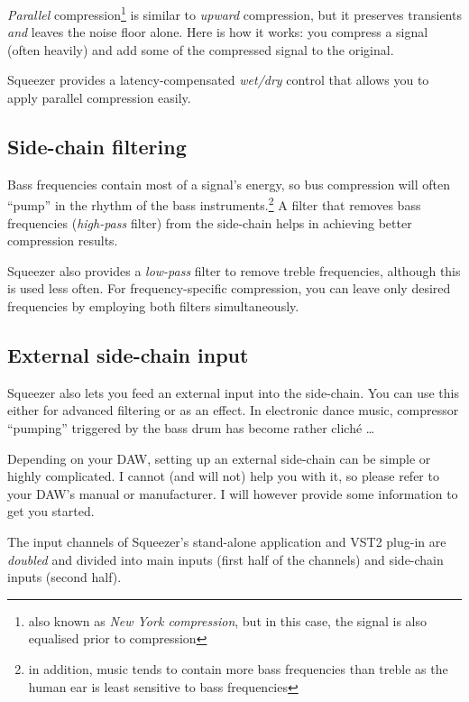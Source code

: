 \emph{Parallel} compression\footnote{also known as \emph{New York
    compression}, but in this case, the signal is also equalised prior
  to compression} is similar to \emph{upward} compression, but it
preserves transients \emph{and} leaves the noise floor alone.  Here is
how it works: you compress a signal (often heavily) and add some of
the compressed signal to the original.

Squeezer provides a latency-compensated \emph{wet/dry} control that
allows you to apply parallel compression easily.

\subsection{Side-chain filtering}
\label{sec:side_chain_filtering}

Bass frequencies contain most of a signal's energy, so bus compression
will often ``pump'' in the rhythm of the bass instruments.\footnote{in
  addition, music tends to contain more bass frequencies than treble
  as the human ear is least sensitive to bass frequencies} A filter
that removes bass frequencies (\emph{high-pass} filter) from the
side-chain helps in achieving better compression results.

Squeezer also provides a \emph{low-pass} filter to remove treble
frequencies, although this is used less often.  For frequency-specific
compression, you can leave only desired frequencies by employing both
filters simultaneously.

\subsection{External side-chain input}
\label{sec:external_side_chain}

Squeezer also lets you feed an external input into the side-chain.
You can use this either for advanced filtering or as an effect.  In
electronic dance music, compressor ``pumping'' triggered by the bass
drum has become rather cliché \dots

Depending on your DAW, setting up an external side-chain can be simple
or highly complicated.  I cannot (and will not) help you with it, so
please refer to your DAW's manual or manufacturer.  I will however
provide some information to get you started.

The input channels of Squeezer's stand-alone application and VST2
plug-in are \emph{doubled} and divided into main inputs (first half of
the channels) and side-chain inputs (second half).

